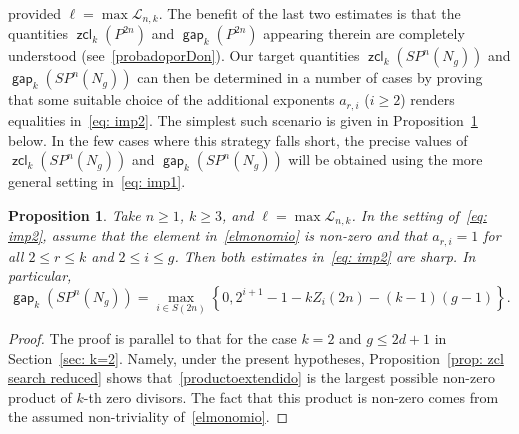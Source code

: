\documentclass[amscd,amssymb,verbatim,10pt]{amsart}
\numberwithin{equation}{section}
\theoremstyle{plain}
\newtheorem{proposition}[thm]{Proposition}
\theoremstyle{definition}
\DeclareMathOperator{\zcl}{{\mathsf{zcl}}}
\DeclareMathOperator{\gap}{{\mathsf{gap}}}
\DeclareMathOperator{\proj}{{\textup{proj}}}
\begin{document}
provided $\ell=\max\mathcal{L}_{n,k}$. The benefit of the last two estimates is that the quantities $\zcl_k(P^{2n})$ and $\gap_k(P^{2n})$ appearing therein are completely understood (see~\eqref{probadoporDon}). Our target quantities $\zcl_k(SP^n(N_g))$ and $\gap_k(SP^n(N_g))$ can then be determined in a number of cases by proving that some suitable choice of the additional exponents $a_{r,i}$ ($i\geq2$) renders equalities in~\eqref{eq: imp2}. The simplest such scenario is given in Proposition~\ref{prop: main tool} below. In the few cases where this strategy falls short, the precise values of $\zcl_k(SP^n(N_g))$ and $\gap_k(SP^n(N_g))$ will be obtained using the more general setting in~\eqref{eq: imp1}.

\begin{proposition}\label{prop: main tool}
    Take $n\geq1$, $k\geq3$, and $\ell=\max\mathcal{L}_{n,k}$. In the setting of~\eqref{eq: imp2}, assume that the element in~\eqref{elmonomio} is non-zero and that
   $a_{r,i}=1$ for all $2\le r\le k$ and $2\le i \le g$. Then both estimates in~\eqref{eq: imp2} are sharp. In particular,
    \[
    \gap_k(SP^n(N_g)) = \max_{i\in S(2n)}\left\{0, 2^{i+1}-1-kZ_i(2n)-(k-1)(g-1) \right\}.
    \]
\end{proposition}

\begin{proof}
    The proof is parallel to that for the case $k=2$ and $g\leq2d+1$ in Section~\ref{sec: k=2}. Namely, under the present hypotheses, Proposition~\ref{prop: zcl search reduced} shows that~\eqref{productoextendido} is the largest possible non-zero product of $k$-th zero divisors. The fact that this product is non-zero comes from the assumed non-triviality of~\eqref{elmonomio}.
\end{proof}
\end{document}
